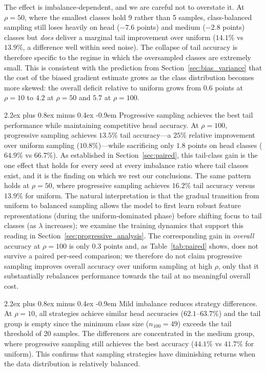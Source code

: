 \documentclass[12pt,a4paper]{article}
\makeatletter
\renewcommand{\paragraph}{\@startsection{paragraph}{4}{\z@}%
  {2.2ex plus 0.8ex minus 0.4ex}%
  {-0.9em}%
  {\normalfont\normalsize\bfseries}}
\makeatother
\begin{document}
The effect is imbalance-dependent, and we are careful not to overstate it. At $\rho = 50$, where the smallest classes hold 9 rather than 5 samples, class-balanced sampling still loses heavily on head ($-7.6$ points) and medium ($-2.8$ points) classes but \emph{does} deliver a marginal tail improvement over uniform ($14.1\%$ vs $13.9\%$, a difference well within seed noise). The collapse of tail accuracy is therefore specific to the regime in which the oversampled classes are extremely small. This is consistent with the prediction from Section~\ref{sec:bias_variance} that the cost of the biased gradient estimate grows as the class distribution becomes more skewed: the overall deficit relative to uniform grows from $0.6$ points at $\rho = 10$ to $4.2$ at $\rho = 50$ and $5.7$ at $\rho = 100$.

\paragraph{Progressive sampling achieves the best tail performance while maintaining competitive head accuracy.} At $\rho = 100$, progressive sampling achieves $13.5\%$ tail accuracy---a $25\%$ relative improvement over uniform sampling ($10.8\%$)---while sacrificing only $1.8$ points on head classes ($64.9\%$ vs $66.7\%$). As established in Section~\ref{sec:paired}, this tail-class gain is the one effect that holds for every seed at every imbalance ratio where tail classes exist, and it is the finding on which we rest our conclusions. The same pattern holds at $\rho = 50$, where progressive sampling achieves $16.2\%$ tail accuracy versus $13.9\%$ for uniform. The natural interpretation is that the gradual transition from uniform to balanced sampling allows the model to first learn robust feature representations (during the uniform-dominated phase) before shifting focus to tail classes (as $\lambda$ increases); we examine the training dynamics that support this reading in Section~\ref{sec:progressive_analysis}. The corresponding gain in \emph{overall} accuracy at $\rho = 100$ is only $0.3$ points and, as Table~\ref{tab:paired} shows, does not survive a paired per-seed comparison; we therefore do not claim progressive sampling improves overall accuracy over uniform sampling at high $\rho$, only that it substantially rebalances performance towards the tail at no meaningful overall cost.


\paragraph{Mild imbalance reduces strategy differences.} At $\rho = 10$, all strategies achieve similar head accuracies ($62.1$--$63.7\%$) and the tail group is empty since the minimum class size ($n_{100} = 49$) exceeds the tail threshold of 20 samples. The differences are concentrated in the medium group, where progressive sampling still achieves the best accuracy ($44.1\%$ vs $41.7\%$ for uniform). This confirms that sampling strategies have diminishing returns when the data distribution is relatively balanced.
\end{document}
